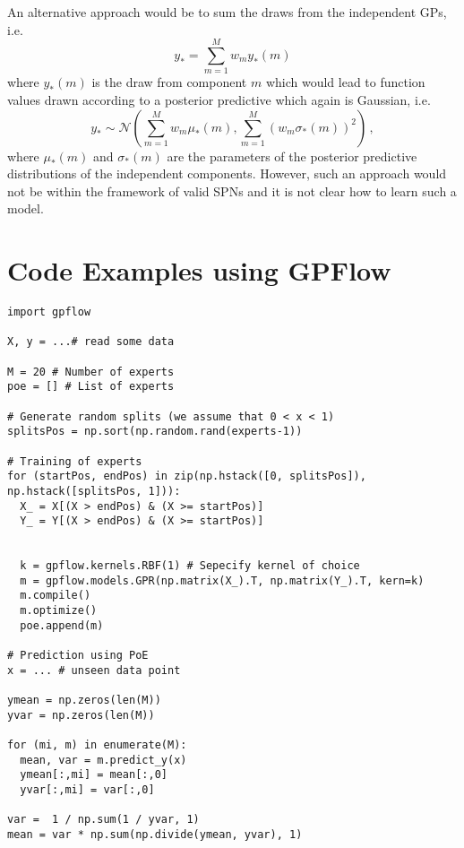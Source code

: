 \documentclass[10pt,letterpaper]{article}
\newcommand\N{\ensuremath{\mathcal{N}}}
\newcommand{\new}{_{*}}
\theoremstyle{mystyle}
\begin{document}
An alternative approach would be to sum the draws from the independent GPs, i.e.
\[
  y\new = \sum_{m=1}^M w_m y\new(m)
\]
where $y\new(m)$ is the draw from component $m$ which would lead to function values drawn according to a posterior predictive which again is Gaussian, i.e.
\[
  y\new \sim \N\left(\sum_{m=1}^M w_m\mu\new(m), \sum_{m=1}^M (w_m \sigma\new(m))^2\right) \, ,
\]
where $\mu\new(m)$ and $\sigma\new(m)$ are the parameters of the posterior predictive distributions of the independent components.
However, such an approach would not be within the framework of valid SPNs and it is not clear how to learn such a model.

\appendix
\section{Code Examples using GPFlow}
\lstset{language=Python}
\lstset{frame=lines}
\lstset{basicstyle=\footnotesize}
\begin{lstlisting}
import gpflow

X, y = ...# read some data

M = 20 # Number of experts
poe = [] # List of experts

# Generate random splits (we assume that 0 < x < 1)
splitsPos = np.sort(np.random.rand(experts-1))

# Training of experts
for (startPos, endPos) in zip(np.hstack([0, splitsPos]), np.hstack([splitsPos, 1])):
  X_ = X[(X > endPos) & (X >= startPos)]
  Y_ = Y[(X > endPos) & (X >= startPos)]


  k = gpflow.kernels.RBF(1) # Sepecify kernel of choice
  m = gpflow.models.GPR(np.matrix(X_).T, np.matrix(Y_).T, kern=k)
  m.compile()
  m.optimize()
  poe.append(m)
    
# Prediction using PoE
x = ... # unseen data point    
    
ymean = np.zeros(len(M))
yvar = np.zeros(len(M))

for (mi, m) in enumerate(M):
  mean, var = m.predict_y(x)
  ymean[:,mi] = mean[:,0]
  yvar[:,mi] = var[:,0]
            
var =  1 / np.sum(1 / yvar, 1)
mean = var * np.sum(np.divide(ymean, yvar), 1)
\end{lstlisting}

\printbibliography
\end{document}
